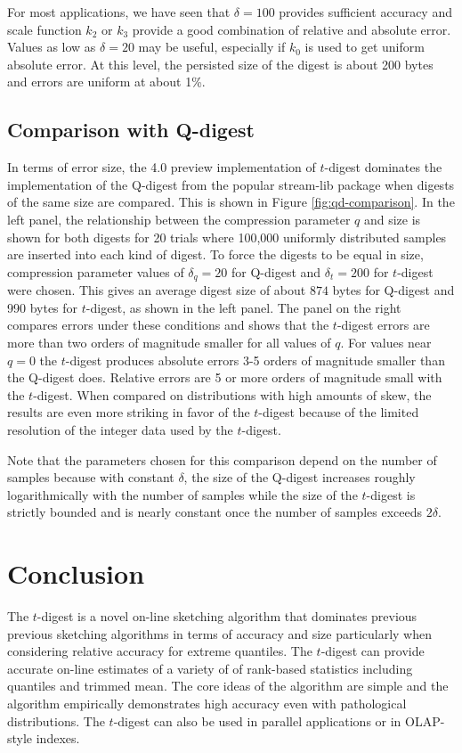 \documentclass{vldb}
\begin{document}
For most applications, we have seen that $\delta=100$ provides sufficient accuracy and scale function $k_2$ or $k_3$ provide a good combination of relative and absolute error. Values as low as $\delta=20$ may be useful, especially if $k_0$ is used to get uniform absolute error. At this level, the persisted size of the digest is about 200 bytes and errors are uniform at about 1\%.

\subsection{Comparison with Q-digest}
In terms of error size, the 4.0 preview implementation of $t$-digest dominates the implementation of the Q-digest from the popular stream-lib package \cite{qdigest,github:stream} when digests of the same size are compared.  This is shown in Figure \ref{fig:qd-comparison}.  In the left panel, the relationship between the compression parameter $q$ and size is shown for both digests for 20 trials where 100,000 uniformly distributed samples are inserted into each kind of digest.  To force the digests to be equal in size, compression parameter values of $\delta_q=20$ for Q-digest  and $\delta_t = 200$ for $t$-digest were chosen. This gives an average digest size of about $874$ bytes for Q-digest and 990 bytes for $t$-digest, as shown in the left panel. The panel on the right compares errors under these conditions and shows that the $t$-digest errors are more than two orders of magnitude smaller for all values of $q$. For values near $q=0$ the $t$-digest produces absolute errors 3-5 orders of magnitude smaller than the Q-digest does. Relative errors are 5 or more orders of magnitude small with the $t$-digest. When compared on distributions with high amounts of skew, the results are even more striking in favor of the $t$-digest because of the limited resolution of the integer data used by the $t$-digest.

Note that the parameters chosen for this comparison depend on the number of samples because with constant $\delta$, the size of the Q-digest increases roughly logarithmically with the number of samples while the size of the $t$-digest is strictly bounded and is nearly constant once the number of samples exceeds $2 \delta$. 

\section{Conclusion}
The $t$-digest is a novel on-line sketching algorithm that dominates previous previous sketching algorithms in terms of accuracy and size particularly when considering relative accuracy for extreme quantiles.  The $t$-digest can provide accurate on-line estimates of a variety of of rank-based statistics including quantiles and trimmed mean. The core ideas of the algorithm are simple and the algorithm empirically demonstrates high accuracy even with pathological distributions.  The $t$-digest can also be used in parallel applications or in OLAP-style indexes.  
\end{document}
